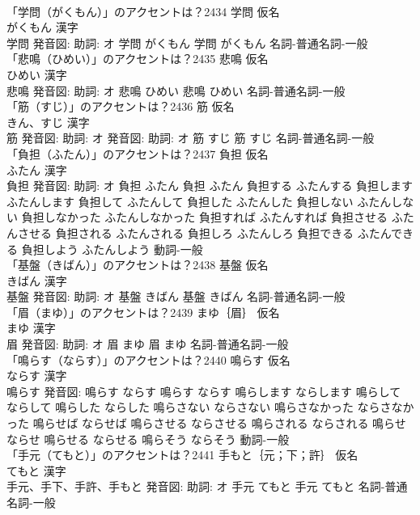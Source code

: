 \documentclass[8pt]{extreport}
\begin{document}
\begin{CJK}{UTF8}{min}
\\	「学問（がくもん）」のアクセントは？2434	学問 仮名　
\\	がくもん 漢字　
\\	学問 発音図: 助詞: オ	学問 がくもん		学問 がくもん				名詞-普通名詞-一般 
\\	「悲鳴（ひめい）」のアクセントは？2435	悲鳴 仮名　
\\	ひめい 漢字　
\\	悲鳴 発音図: 助詞: オ	悲鳴 ひめい		悲鳴 ひめい				名詞-普通名詞-一般 
\\	「筋（すじ）」のアクセントは？2436	筋 仮名　
\\	きん、すじ 漢字　
\\	筋 発音図: 助詞: オ 発音図: 助詞: オ	筋 すじ		筋 すじ				名詞-普通名詞-一般 
\\	「負担（ふたん）」のアクセントは？2437	負担 仮名　
\\	ふたん 漢字　
\\	負担 発音図: 助詞: オ	負担 ふたん		負担 ふたん 負担する ふたんする 負担します ふたんします 負担して ふたんして 負担した ふたんした 負担しない ふたんしない 負担しなかった ふたんしなかった 負担すれば ふたんすれば 負担させる ふたんさせる 負担される ふたんされる 負担しろ ふたんしろ 負担できる ふたんできる 負担しよう ふたんしよう				動詞-一般 
\\	「基盤（きばん）」のアクセントは？2438	基盤 仮名　
\\	きばん 漢字　
\\	基盤 発音図: 助詞: オ	基盤 きばん		基盤 きばん				名詞-普通名詞-一般 
\\	「眉（まゆ）」のアクセントは？2439	まゆ｛眉｝ 仮名　
\\	まゆ 漢字　
\\	眉 発音図: 助詞: オ	眉 まゆ		眉 まゆ				名詞-普通名詞-一般 
\\	「鳴らす（ならす）」のアクセントは？2440	鳴らす 仮名　
\\	ならす 漢字　
\\	鳴らす 発音図:	鳴らす ならす		鳴らす ならす 鳴らします ならします 鳴らして ならして 鳴らした ならした 鳴らさない ならさない 鳴らさなかった ならさなかった 鳴らせば ならせば 鳴らさせる ならさせる 鳴らされる ならされる 鳴らせ ならせ 鳴らせる ならせる 鳴らそう ならそう				動詞-一般 
\\	「手元（てもと）」のアクセントは？2441	手もと｛元；下；許｝ 仮名　
\\	てもと 漢字　
\\	手元、手下、手許、手もと 発音図: 助詞: オ	手元 てもと		手元 てもと				名詞-普通名詞-一般 

\end{CJK}
\end{document}
